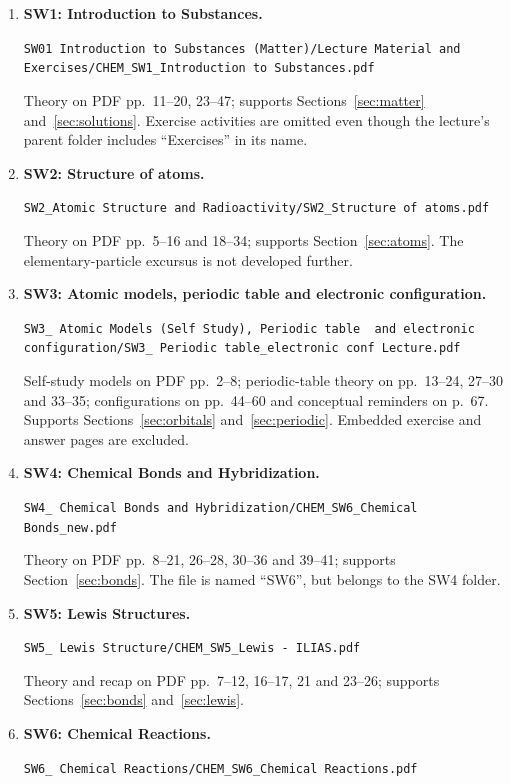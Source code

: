 \documentclass[a4paper,10pt]{article}
\begin{document}
\begingroup
\raggedright
\begin{enumerate}
  \item \textbf{SW1: Introduction to Substances.}\par
  \nolinkurl{SW01 Introduction to Substances (Matter)/Lecture Material and Exercises/CHEM_SW1_Introduction to Substances.pdf}\par
  Theory on PDF pp.~11--20, 23--47; supports Sections~\ref{sec:matter}
  and~\ref{sec:solutions}. Exercise activities are omitted even though the
  lecture's parent folder includes ``Exercises'' in its name.
  \item \textbf{SW2: Structure of atoms.}\par
  \nolinkurl{SW2_Atomic Structure and Radioactivity/SW2_Structure of atoms.pdf}\par
  Theory on PDF pp.~5--16 and 18--34; supports Section~\ref{sec:atoms}.
  The elementary-particle excursus is not developed further.
  \item \textbf{SW3: Atomic models, periodic table and electronic configuration.}\par
  \nolinkurl{SW3_ Atomic Models (Self Study), Periodic table  and electronic configuration/SW3_ Periodic table_electronic conf Lecture.pdf}\par
  Self-study models on PDF pp.~2--8; periodic-table theory on pp.~13--24,
  27--30 and 33--35; configurations on pp.~44--60 and conceptual reminders
  on p.~67. Supports Sections~\ref{sec:orbitals} and~\ref{sec:periodic}.
  Embedded exercise and answer pages are excluded.
  \item \textbf{SW4: Chemical Bonds and Hybridization.}\par
  \nolinkurl{SW4_ Chemical Bonds and Hybridization/CHEM_SW6_Chemical Bonds_new.pdf}\par
  Theory on PDF pp.~8--21, 26--28, 30--36 and 39--41; supports
  Section~\ref{sec:bonds}. The file is named ``SW6'', but belongs to the SW4 folder.
  \item \textbf{SW5: Lewis Structures.}\par
  \nolinkurl{SW5_ Lewis Structure/CHEM_SW5_Lewis - ILIAS.pdf}\par
  Theory and recap on PDF pp.~7--12, 16--17, 21 and 23--26; supports
  Sections~\ref{sec:bonds} and~\ref{sec:lewis}.
  \item \textbf{SW6: Chemical Reactions.}\par
  \nolinkurl{SW6_ Chemical Reactions/CHEM_SW6_Chemical Reactions.pdf}\par

\end{enumerate}
\end{document}
